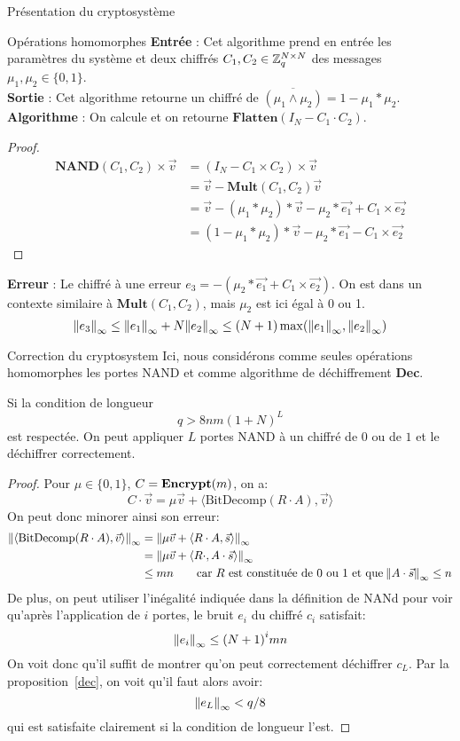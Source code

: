 \begin{section}{Présentation du cryptosystème}
\begin{subsection}{Opérations homomorphes}
	\textbf{Entrée} : Cet algorithme prend en entrée les paramètres du système et deux chiffrés $C_1, C_2 \in \mathbb{Z}_q^{N \times N}$ des messages $\mu_1, \mu_2 \in \{ 0,1\}$.\\
	\textbf{Sortie} : Cet algorithme retourne un chiffré de $\overline{(\mu_1 \land \mu_2)} = 1 - \mu_1 * \mu_2$. \\
	\textbf{Algorithme} : On calcule et on retourne $\textbf{Flatten}(I_N - C_1 \cdot C_2)$.
	\begin{proof}
	\begin{align*}
	\textbf{NAND}(C_1, C_2) \times \vec{v} &= (I_N - C_1 \times C_2) \times \vec{v} \\
	&= \vec{v} - \textbf{Mult}(C_1, C_2)\vec{v} \\
	&= \vec{v} - (\mu_1 * \mu_2) * \vec{v} - \mu_2 * \vec{e_1} + C_1 \times \vec{e_2} \\
	&= (1 - \mu_1 * \mu_2) * \vec{v} - \mu_2 * \vec{e_1} - C_1 \times \vec{e_2}
	\end{align*}
	\end{proof}
	\textbf{Erreur} : Le chiffré à une erreur 
	$e_3 = -(\mu_2 * \vec{e_1} + C_1 \times \vec{e_2})$. On est dans 
	un contexte similaire à $\textbf{Mult}(C_1, C_2)$, mais 
	$\mu_2$ est ici égal à 0 ou 1.
\[{\|e_3\|}_{\infty} \leq {\|e_1\|}_{\infty} + N {\|e_2\|}_{\infty} \leq (N+1) \max({\|e_1\|}_{\infty}, {\|e_2\|}_{\infty})\]
	\end{subsection}
	\begin{subsection}{Correction du cryptosystem}
	Ici, nous considérons comme seules opérations homomorphes les portes
	NAND et comme algorithme de déchiffrement \textbf{Dec}.
	\begin{prop}
	Si la condition de longueur 
	\[q > 8nm (1 + N)^L \]
	est respectée. On peut appliquer $L$ portes NAND à un chiffré
	de $0$ ou de $1$ et le déchiffrer correctement.
	\end{prop}
	\begin{proof}
	Pour $\mu \in \{0,1\}$, $C = \text{\textbf{Encrypt}}(m)$, on a:
	\[
	C\cdot \vec{v} = \mu \vec{v} + \langle \text{BitDecomp}(R\cdot A), \vec{v} \rangle 
	\]
	On peut donc minorer ainsi son erreur:
	\begin{align*}
	{\|\langle \text{BitDecomp}(R\cdot A), \vec{v} \rangle\|}_{\infty}
	&= {\|\mu \vec{v} + \langle R\cdot A, \vec{s} \rangle\|}_{\infty}\\
	&= {\|\mu \vec{v} + \langle R\cdot , A\cdot \vec{s} \rangle\|}_{\infty} \\
	&\leq  m n \qquad \text{car $R$ est constituée de $0$ ou $1$ et que}
	\: {\|A\cdot\vec{s}\|}_{\infty} \leq n
	\end{align*}
	De plus, on peut utiliser l'inégalité indiquée dans la définition de
	NANd pour voir qu'après l'application de $i$ portes, le bruit $e_i$ du
	chiffré  $c_i$ satisfait:
	\[ {\|e_i\|}_{\infty} \leq {(N+1)}^i  mn \]
	On voit donc qu'il suffit de montrer qu'on peut correctement déchiffrer
	$c_L$. Par la proposition~\ref{dec}, on voit qu'il faut alors avoir:
	\[ {\|e_L\|}_{\infty} < q/8 \] 
	qui est satisfaite clairement si la condition de longueur l'est.
	\end{proof}
	\end{subsection}
\end{section}
